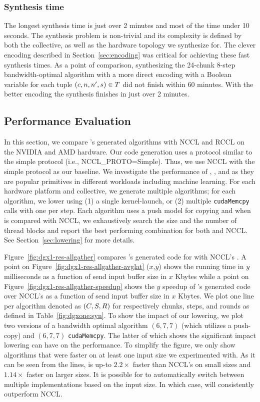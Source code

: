\subsubsection{Synthesis time}
The longest synthesis time is just over 2 minutes and most of the time
under 10 seconds.  The synthesis problem is non-trivial and its
complexity is defined by both the collective, as well as the hardware
topology we synthesize for. The clever encoding described in
Section~\ref{sec:encoding} was critical for achieving these fast
synthesis times. As a point of comparison, synthesizing the 24-chunk
8-step bandwidth-optimal \alltoall algorithm with a more direct
encoding with a Boolean variable for each tuple $(c, n, n', s) \in
T$ did not finish within 60 minutes. With the better encoding the
synthesis finishes in just over 2 minutes.

\subsection{Performance Evaluation}
In this section, we compare \tool's generated algorithms with NCCL and
RCCL on the NVIDIA and AMD hardware.  Our code generation uses a
protocol similar to the simple protocol (i.e., NCCL\_PROTO=Simple).
Thus, we use NCCL with the simple protocol as our baseline. We
investigate the performance of \allgather, \allreduce, and \alltoall
as they are popular primitives in different workloads including
machine learning. For each hardware platform and collective, we
generate multiple algorithms; for each algorithm, we lower using (1) a
single kernel-launch, or (2) multiple \texttt{cudaMemcpy} calls with
one per step. Each algorithm uses a push model for copying and when
\tool{} is compared with NCCL, we exhaustively search the size and the
number of thread blocks and report the best performing combination for
both \tool{} and NCCL. See Section~\ref{sec:lowering} for more
details.


Figure~\ref{fig:dgx1-res-allgather} compares \tool's generated code
for \allgather with NCCL's \allgather. A point on
Figure~\ref{fig:dgx1-res-allgather-avglat} ($x$,$y$) shows the running
time in $y$ milliseconds as a function of send input buffer size in
$x$ Kbytes while a point on
Figure~\ref{fig:dgx1-res-allgather-speedup} shows the $y$ speedup of
\tool's generated code over NCCL's \allgather as a function of send
input buffer size in $x$ Kbytes. We plot one line per algorithm
denoted as $(C, S, R)$ for respectively chunks, steps,
and rounds as defined in Table~\ref{fig:dgxone:syn}. To show the
impact of our lowering, we plot two versions of a bandwidth optimal
algorithm $(6,7,7)$ (which utilizes a push-copy) and $(6,7,7)$
\texttt{cudaMemcpy}.  The latter of which shows the significant impact
lowering can have on the performance. To simplify the figure, we only
show algorithms that were faster on at least one input size we
experimented with. As it can be seen from the lines, \tool{} is up-to
$2.2\times$ faster than NCCL's \allgather on small sizes and
$1.14\times$ faster on larger sizes. It is possible for \tool{} to
automatically switch between multiple implementations based on the
input size. In which case, \tool{} will consistently outperform NCCL.

